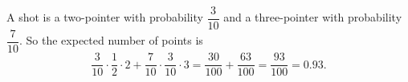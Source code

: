 A shot is a two-pointer with probability $\dfrac3{10}$ and a three-pointer with probability $\dfrac7{10}$. So the expected number of points is
\[\dfrac{3}{10}\cdot\dfrac12\cdot2+\dfrac{7}{10}\cdot\dfrac{3}{10}\cdot3=\dfrac{30}{100}+\dfrac{63}{100}=\boxed{\dfrac{93}{100}=0.93}.\]
